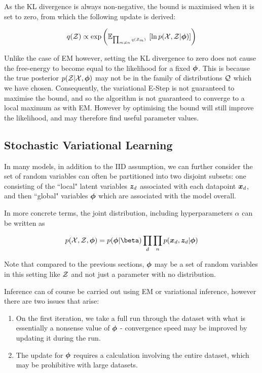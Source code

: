 As the KL divergence is always non-negative, the bound is maximised when it is set to zero, from which the following update is derived: 

\begin{align*}
q({ \mathcal{Z} }) \propto \exp\left( { \mathbb{E}_{ { {{ \mbox{\tiny ${\prod_{m\neq n} q({ \mathcal{Z} }_m)}$ } }} } }\left[ { \ln { p( { \mathcal{X} } ,  { \mathcal{Z} } |  {  \bm \phi  } ) } } \right] }  \right)
\end{align*}

Unlike the case of EM however, setting the KL divergence to zero does not cause the free-energy to become equal to the likelihood for a fixed ${ \bm \phi }$. This is because the true posterior $p({ \mathcal{Z} } | { \mathcal{X} }, { \bm \phi })$ may not be in the family of distributions ${ \mathcal{Q} }$ which we have chosen. Consequently, the variational E-Step is not guaranteed to maximise the bound, and so the algorithm is not guaranteed to converge to a local maximum as with EM. However by optimising the bound will still improve the likelihood, and may therefore find useful parameter values.

\subsection{Stochastic Variational Learning}
In many models, in addition to the IID assumption, we can further consider the set of random variables can often be partitioned into two disjoint subsets: one consisting of the ``local" latent variables ${ \bm z_d }$  associated with each datapoint ${ \bm x_d }$, and then ``global" variables ${ \bm \phi }$ which are associated with the model overall.

In more concrete terms, the joint distribution, including hyperparameters $\alpha$ can be written as

\begin{align*}
p(\xdat, \zdat, \param) = p(\param | \beta)  \prod_d \prod_n p(\xd, \zd | \param)\end{align*}

Note that compared to the previous sections, ${ \bm \phi }$ may be a set of random variables in this setting like ${ \mathcal{Z} }$ and not just a parameter with no distribution.

Inference can of course be carried out using EM or variational inference, however there are two issues that arise:

\begin{enumerate}
    \item On the first iteration, we take a full run through the dataset with what is essentially a nonsense value of ${ \bm \phi }$ - convergence speed may be improved by updating it during the run.
    \item The update for ${ \bm \phi }$ requires a calculation involving the entire dataset, which may be prohibitive with large datasets.\
\end{enumerate}

